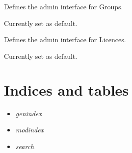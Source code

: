 \documentclass[letterpaper,10pt,english]{sphinxmanual}
\begin{document}
\begin{fulllineitems}
\label{api:groups.admin.GroupAdmin}
Defines the admin interface for Groups.

Currently set as default.

\begin{fulllineitems}
\label{api:groups.admin.GroupAdmin.media}
\end{fulllineitems}


\end{fulllineitems}


\begin{fulllineitems}
\label{api:groups.admin.LicenseAdmin}
Defines the admin interface for Licences.

Currently set as default.

\begin{fulllineitems}
\label{api:groups.admin.LicenseAdmin.media}
\end{fulllineitems}


\end{fulllineitems}



\chapter{Indices and tables}
\label{index:indices-and-tables}\begin{itemize}
\item {} 
\emph{genindex}

\item {} 
\emph{modindex}

\item {} 
\emph{search}

\end{itemize}
\end{document}
